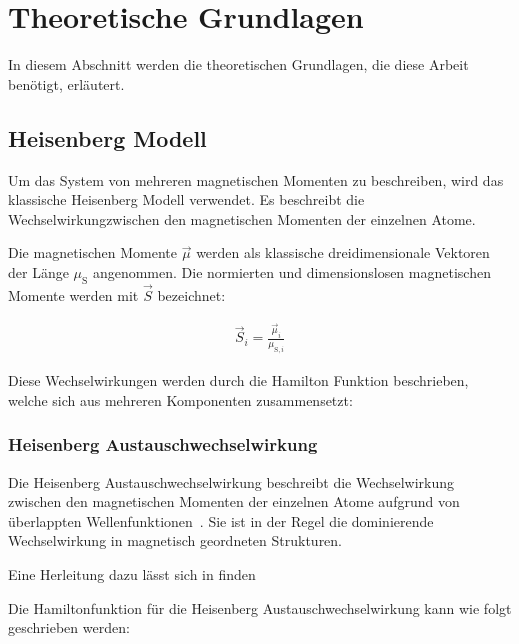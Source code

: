 \documentclass[main.tex]{subfiles}
\begin{document}
\newpage
\section{Theoretische Grundlagen}
In diesem Abschnitt werden die theoretischen Grundlagen, die diese Arbeit benötigt, erläutert.

\subsection{Heisenberg Modell}

Um das System von mehreren magnetischen Momenten zu beschreiben, wird das klassische Heisenberg Modell verwendet. Es beschreibt die Wechselwirkungzwischen den magnetischen Momenten der einzelnen Atome.

Die magnetischen Momente \(\vec{\mu}\) werden als klassische dreidimensionale Vektoren der Länge \(\mu_{\text{S}}\) angenommen.
Die normierten und dimensionslosen magnetischen Momente werden mit \(\vec{S}\) bezeichnet:

\begin{align}
	\vec{S}_i = \frac{\vec{\mu}_i}{\mu_{\text{S},i}}
\end{align}


Diese Wechselwirkungen werden durch die Hamilton Funktion beschrieben, welche sich aus mehreren Komponenten zusammensetzt:

\subsubsection*{Heisenberg Austauschwechselwirkung}

Die Heisenberg Austauschwechselwirkung beschreibt die Wechselwirkung zwischen den magnetischen Momenten der einzelnen Atome aufgrund von überlappten Wellenfunktionen~\cite{Heisenberg-Ferromagnetismus}. 
Sie ist in der Regel die dominierende Wechselwirkung in magnetisch geordneten Strukturen.

Eine Herleitung dazu lässt sich in \cite{magnetism-in-condensed-matter} finden

Die Hamiltonfunktion für die Heisenberg Austauschwechselwirkung kann wie folgt geschrieben werden:
\end{document}

